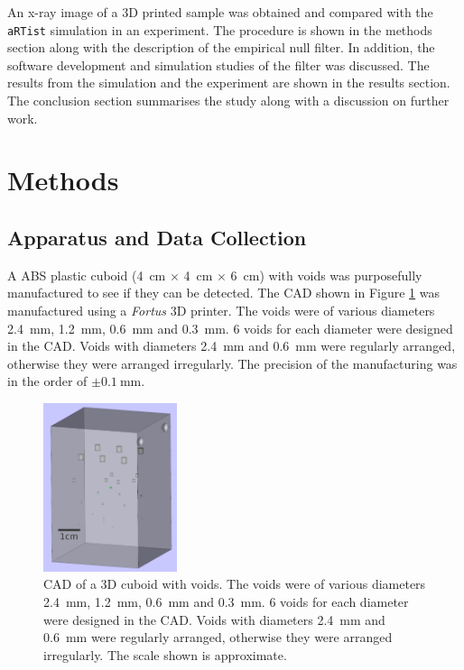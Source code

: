 \documentclass{proc}
\begin{document}
An x-ray image of a 3D printed sample was obtained and compared with the \texttt{aRTist} simulation in an experiment. The procedure is shown in the methods section along with the description of the empirical null filter. In addition, the software development and simulation studies of the filter was discussed. The results from the simulation and the experiment are shown in the results section. The conclusion section summarises the study along with a discussion on further work.

\section{Methods}

\subsection{Apparatus and Data Collection}

A ABS plastic cuboid (\SI{4}{\centi\metre} $\times$ \SI{4}{\centi\metre} $\times$ \SI{6}{\centi\metre}) with voids was purposefully manufactured to see if they can be detected. The CAD shown in Figure \ref{fig:inference_testObject} was manufactured using a \emph{Fortus} 3D printer. The voids were of various diameters \SI{2.4}{\milli\metre}, \SI{1.2}{\milli\metre}, \SI{0.6}{\milli\metre} and \SI{0.3}{\milli\metre}. 6 voids for each diameter were designed in the CAD. Voids with diameters \SI{2.4}{\milli\metre} and \SI{0.6}{\milli\metre} were regularly arranged, otherwise they were arranged irregularly. The precision of the manufacturing was in the order of $\pm\SI{0.1}{\milli\metre}$.

\begin{figure}
  \centering
  \includegraphics[width=0.35\textwidth]{../figures/inference/TestObject.png}
  \caption{CAD of a 3D cuboid with voids. The voids were of various diameters \SI{2.4}{\milli\metre}, \SI{1.2}{\milli\metre}, \SI{0.6}{\milli\metre} and \SI{0.3}{\milli\metre}. 6 voids for each diameter were designed in the CAD. Voids with diameters \SI{2.4}{\milli\metre} and \SI{0.6}{\milli\metre} were regularly arranged, otherwise they were arranged irregularly. The scale shown is approximate.}
  \label{fig:inference_testObject}
\end{figure}
\end{document}
